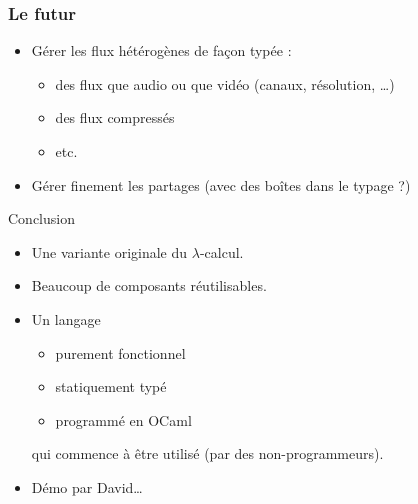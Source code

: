 \documentclass{beamer}
\begin{document}
\begin{frame}
  \frametitle{Le futur}

  \begin{itemize}
  \item Gérer les flux hétérogènes de façon typée :
    \begin{itemize}
    \item des flux que audio ou que vidéo (canaux, résolution, \ldots)
    \item des flux compressés
    \item etc.
    \end{itemize}
  \item Gérer finement les partages (avec des boîtes dans le typage ?)
  \end{itemize}
\end{frame}


\begin{ssl}{Conclusion}
\begin{itemize}
\item Une variante originale du $\lambda$-calcul.
\item<2-> Beaucoup de composants réutilisables.
\item<3-> Un langage
  \begin{itemize}
  \item purement fonctionnel
  \item statiquement typé
  \item programmé en OCaml
  \end{itemize}
  qui commence à être utilisé (par des non-programmeurs).
\item<4-> Démo par David\ldots
\end{itemize}
\end{ssl}
\end{document}
